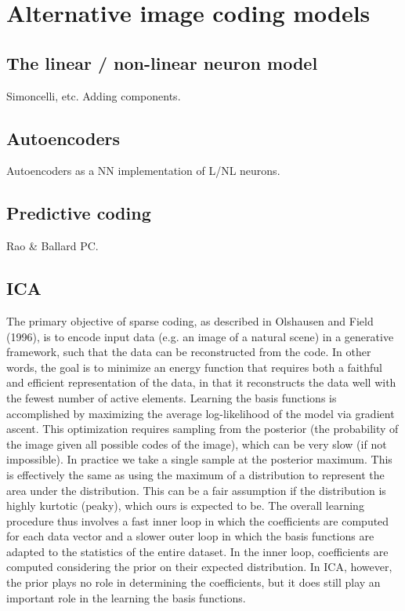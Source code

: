 \section{Alternative image coding models}

\subsection{The linear / non-linear neuron model}
Simoncelli, etc. Adding components.

\subsection{Autoencoders}
Autoencoders as a NN implementation of L/NL neurons.

\subsection{Predictive coding}
Rao & Ballard PC.

\subsection{ICA}

The primary objective of sparse coding, as described in Olshausen and Field (1996), is to encode input data (e.g. an image of a natural scene) in a generative framework, such that the data can be reconstructed from the code. In other words, the goal is to minimize an energy function that requires both a faithful and efficient representation of the data, in that it reconstructs the data well with the fewest number of active elements. Learning the basis functions is accomplished by maximizing the average log-likelihood of the model via gradient ascent. This optimization requires sampling from the posterior (the probability of the image given all possible codes of the image), which can be very slow (if not impossible). In practice we take a single sample at the posterior maximum. This is effectively the same as using the maximum of a distribution to represent the area under the distribution. This can be a fair assumption if the distribution is highly kurtotic (peaky), which ours is expected to be. The overall learning procedure thus involves a fast inner loop in which the coefficients are computed for each data vector and a slower outer loop in which the basis functions are adapted to the statistics of the entire dataset. In the inner loop, coefficients are computed considering the prior on their expected distribution. In ICA, however, the prior plays no role in determining the coefficients, but it does still play an important role in the learning the basis functions.

